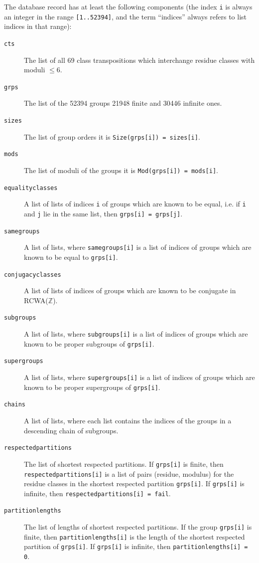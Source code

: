 \documentclass[a4paper,11pt]{report}
\begin{document}
{{{ The database record has at least the following components (the index \texttt{i} is always an integer in the range \texttt{[1..52394]}, and the term ``indices'' always refers to list indices in that range): 
\begin{description}
\item[{\texttt{cts}}]  The list of all 69 class transpositions which interchange residue classes with
moduli $\leq 6$. 
\item[{\texttt{grps}}]  The list of the 52394 groups \texttt{}\texttt{} 21948
finite and 30446 infinite ones. 
\item[{\texttt{sizes}}]  The list of group orders \texttt{}\texttt{} it is \texttt{Size(grps[i]) = sizes[i]}. 
\item[{\texttt{mods}}]  The list of moduli of the groups \texttt{}\texttt{} it
is \texttt{Mod(grps[i]) = mods[i]}. 
\item[{\texttt{equalityclasses}}]  A list of lists of indices \texttt{i} of groups which are known to be equal, i.e. if \texttt{i} and \texttt{j} lie in the same list, then \texttt{grps[i] = grps[j]}. 
\item[{\texttt{samegroups}}]  A list of lists, where \texttt{samegroups[i]} is a list of indices of groups which are known to be equal to \texttt{grps[i]}. 
\item[{\texttt{conjugacyclasses}}]  A list of lists of indices of groups which are known to be conjugate in
RCWA({\ensuremath{\mathbb Z}}). 
\item[{\texttt{subgroups}}]  A list of lists, where \texttt{subgroups[i]} is a list of indices of groups which are known to be proper subgroups of \texttt{grps[i]}. 
\item[{\texttt{supergroups}}]  A list of lists, where \texttt{supergroups[i]} is a list of indices of groups which are known to be proper supergroups of \texttt{grps[i]}. 
\item[{\texttt{chains}}]  A list of lists, where each list contains the indices of the groups in a
descending chain of subgroups. 
\item[{\texttt{respectedpartitions}}]  The list of shortest respected partitions. If \texttt{grps[i]} is finite, then \texttt{respectedpartitions[i]} is a list of pairs (residue, modulus) for the residue classes in the shortest
respected partition \texttt{grps[i]}. If \texttt{grps[i]} is infinite, then \texttt{respectedpartitions[i] = fail}. 
\item[{\texttt{partitionlengths}}]  The list of lengths of shortest respected partitions. If the group \texttt{grps[i]} is finite, then \texttt{partitionlengths[i]} is the length of the shortest respected partition of \texttt{grps[i]}. If \texttt{grps[i]} is infinite, then \texttt{partitionlengths[i] = 0}. 

\end{description}}}}
\end{document}
